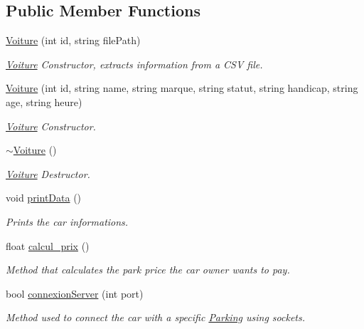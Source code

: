 \subsection*{Public Member Functions}
\begin{DoxyCompactItemize}
\item 
\mbox{\hyperlink{class_voiture_a9f8646dde1dd92d80cf56b975bba97c2}{Voiture}} (int id, string file\+Path)
\begin{DoxyCompactList}\small\item\em \mbox{\hyperlink{class_voiture}{Voiture}} Constructor, extracts information from a C\+SV file. \end{DoxyCompactList}\item 
\mbox{\hyperlink{class_voiture_a77002698169f77149f6bd92f875b86cf}{Voiture}} (int id, string name, string marque, string statut, string handicap, string age, string heure)
\begin{DoxyCompactList}\small\item\em \mbox{\hyperlink{class_voiture}{Voiture}} Constructor. \end{DoxyCompactList}\item 
\mbox{\label{class_voiture_afe85820a993b6908d0fdb524245e5133}} 
\mbox{\hyperlink{class_voiture_afe85820a993b6908d0fdb524245e5133}{$\sim$\+Voiture}} ()
\begin{DoxyCompactList}\small\item\em \mbox{\hyperlink{class_voiture}{Voiture}} Destructor. \end{DoxyCompactList}\item 
\mbox{\label{class_voiture_a3d786c35df10757794b241134f5e2f2e}} 
void \mbox{\hyperlink{class_voiture_a3d786c35df10757794b241134f5e2f2e}{print\+Data}} ()
\begin{DoxyCompactList}\small\item\em Prints the car informations. \end{DoxyCompactList}\item 
float \mbox{\hyperlink{class_voiture_a1cd531495d64c694292374d96724c654}{calcul\+\_\+prix}} ()
\begin{DoxyCompactList}\small\item\em Method that calculates the park price the car owner wants to pay. \end{DoxyCompactList}\item 
bool \mbox{\hyperlink{class_voiture_abbc7a9f5a9e05a92b75623ff87bee85c}{connexion\+Server}} (int port)
\begin{DoxyCompactList}\small\item\em Method used to connect the car with a specific \mbox{\hyperlink{class_parking}{Parking}} using sockets. \end{DoxyCompactList}\end{DoxyCompactItemize}


